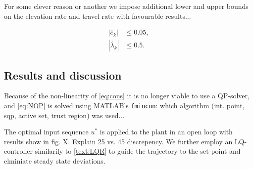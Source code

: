 For some clever reason or another we impose additional lower and upper bounds on the elevation rate and travel rate with favourable results...

\begin{align*}
	|\dot{e_k}| &\le 0.05, \\
	|\dot{\lambda_k}| &\le 0.5.
\end{align*}
\subsection{Results and discussion}
 Because of the non-linearity of \eqref{eq:cons} it is no longer viable to use a QP-solver, and \eqref{eq:NOP} is solved using MATLAB's \texttt{fmincon}: which algorithm (int. point, sqp, active set, trust region) was used...

The optimal input sequence $u^*$ is applied to the plant in an open loop with results show in fig. X. Explain 25 vs. 45 discrepency. We further employ an LQ-controller similarily to \ref{text:LQR} to guide the trajectory to the set-point and elminiate steady state deviations.

